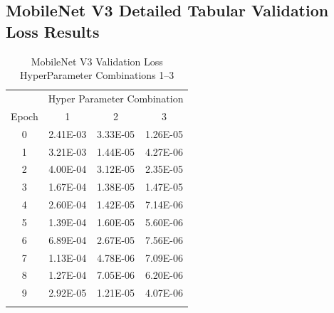 \documentclass[10pt, conference]{IEEEtran}
\begin{document}


\subsection{MobileNet V3 Detailed Tabular Validation Loss Results} %

\begin{table}[H]
    \centering
    \begin{tabular}{@{}cccc@{}}
        \toprule
        & \multicolumn{3}{c}{Hyper Parameter Combination} \\
        \cmidrule{2-4}
            Epoch  & 1 & 2 & 3\\
        \midrule

        0 & 2.41E-03 & 3.33E-05 & 1.26E-05 \\
        1 & 3.21E-03 & 1.44E-05 & 4.27E-06 \\
        2 & 4.00E-04 & 3.12E-05 & 2.35E-05 \\
        3 & 1.67E-04 & 1.38E-05 & 1.47E-05 \\
        4 & 2.60E-04 & 1.42E-05 & 7.14E-06 \\
        5 & 1.39E-04 & 1.60E-05 & 5.60E-06 \\
        6 & 6.89E-04 & 2.67E-05 & 7.56E-06 \\
        7 & 1.13E-04 & 4.78E-06 & 7.09E-06 \\
        8 & 1.27E-04 & 7.05E-06 & 6.20E-06 \\
        9 & 2.92E-05 & 1.21E-05 & 4.07E-06 \\

        \bottomrule\smallskip
    \end{tabular}
    \caption{MobileNet V3 Validation Loss HyperParameter Combinations 1--3}%
    \label{table:MobileNetV3ValidationLoss1-3}
\end{table}
\end{document}
